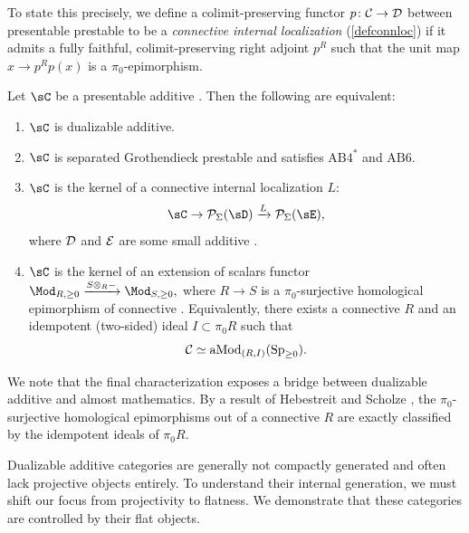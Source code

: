 \documentclass[a4paper,10pt, oneside]{amsart}
\begin{document}
To state this precisely, we define a colimit-preserving functor $p \colon \mathcal{C} \to \mathcal{D}$ between presentable prestable \infcats to be a \emph{connective internal localization} (\cref{defconnloc}) if it admits a fully faithful, colimit-preserving right adjoint $p^R$ such that the unit map $x \to p^R p(x)$ is a $\pi_0$-epimorphism.
\begin{thmX}
	Let $\sC$ be a presentable additive \infcat. Then the following are equivalent:
	\begin{enumerate}
		\item $\sC$ is dualizable additive.
		\item $\sC$ is separated Grothendieck prestable and satisfies $\mathrm{AB4}^*$ and $\mathrm{AB6}$.
		\item $\sC$ is the kernel of a connective internal localization $L$:
		\[
		\sC \to  \mc{P}_\Sigma(\sD) \xrightarrow{L}  \mc{P}_\Sigma(\sE),
		\]
		where $\mathcal{D}$ and $\mathcal{E}$ are some small additive \infcats.
		\item $\sC$ is the kernel of an extension of scalars functor
		$
	  \Mod_{R,\geq0} \xrightarrow{S\otimes_R -}  \Mod_{S,\geq0},
		$
		where $R \to S$ is a $\pi_0$-surjective homological epimorphism of connective \eonerings. Equivalently, there exists a connective \eonering $R$ and an idempotent (two-sided) ideal $I\subset \pi_0R$ such that 
		\[
		\mathcal{C}\simeq \operatorname{aMod}_{(R,I)}(\operatorname{Sp}_{\geq0}).
		\]
	\end{enumerate}
\end{thmX}

We note that the final characterization 
exposes a  bridge between dualizable additive \infcats and almost mathematics.
 By a result of Hebestreit and Scholze \cite{hebestreit2024note}, the $\pi_0$-surjective homological epimorphisms out of a connective \eonering $R$ are exactly classified by the idempotent ideals of $\pi_0R$.
 
Dualizable additive categories are generally not compactly generated and often lack 
projective objects entirely. To understand their internal generation, we must shift our focus from projectivity to flatness. 
We demonstrate that these categories are controlled by their flat objects.
\end{document}
